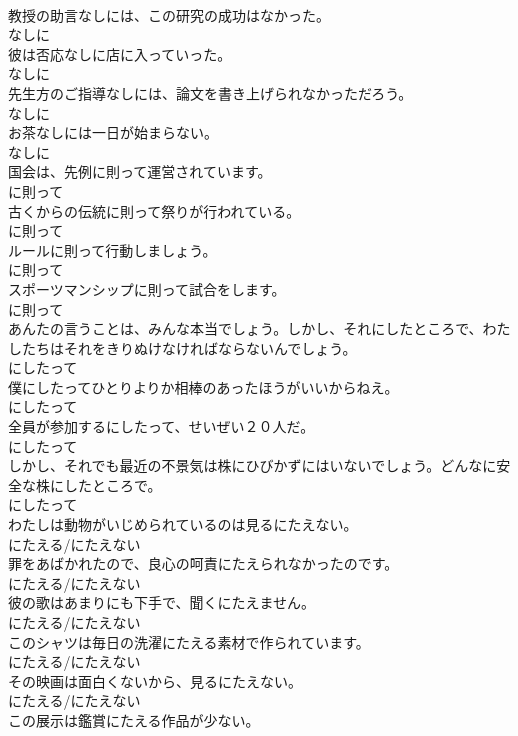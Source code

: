 \documentclass[8pt]{extreport}
\begin{document}
\begin{CJK}{UTF8}{min}
\\	教授の助言なしには、この研究の成功はなかった。	
\\	なしに
\\	彼は否応なしに店に入っていった。	
\\	なしに
\\	先生方のご指導なしには、論文を書き上げられなかっただろう。	
\\	なしに
\\	お茶なしには一日が始まらない。	
\\	なしに
\\	国会は、先例に則って運営されています。	
\\	に則って
\\	古くからの伝統に則って祭りが行われている。	
\\	に則って
\\	ルールに則って行動しましょう。	
\\	に則って
\\	スポーツマンシップに則って試合をします。	
\\	に則って
\\	あんたの言うことは、みんな本当でしょう。しかし、それにしたところで、わたしたちはそれをきりぬけなければならないんでしょう。	
\\	にしたって
\\	僕にしたってひとりよりか相棒のあったほうがいいからねえ。	
\\	にしたって
\\	全員が参加するにしたって、せいぜい２０人だ。	
\\	にしたって
\\	しかし、それでも最近の不景気は株にひびかずにはいないでしょう。どんなに安全な株にしたところで。	
\\	にしたって
\\	わたしは動物がいじめられているのは見るにたえない。	
\\	にたえる/にたえない
\\	罪をあばかれたので、良心の呵責にたえられなかったのです。	
\\	にたえる/にたえない
\\	彼の歌はあまりにも下手で、聞くにたえません。	
\\	にたえる/にたえない
\\	このシャツは毎日の洗濯にたえる素材で作られています。	
\\	にたえる/にたえない
\\	その映画は面白くないから、見るにたえない。	
\\	にたえる/にたえない
\\	この展示は鑑賞にたえる作品が少ない。	

\end{CJK}
\end{document}
